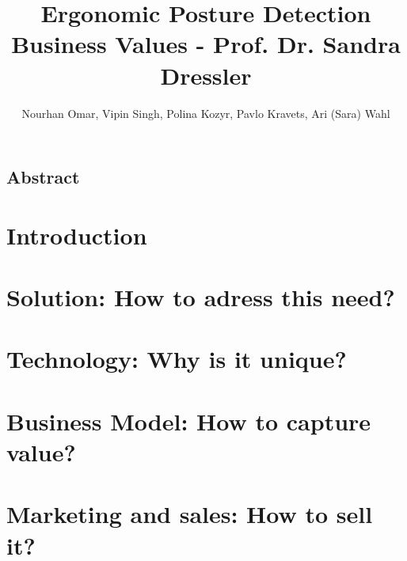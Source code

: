 \documentclass[a4paper, 11pt]{report}
\title{
    {\Huge Ergonomic Posture Detection}\\
    {\large Business Values - Prof. Dr. Sandra Dressler}
}
\author{Nourhan Omar, Vipin Singh, Polina Kozyr, Pavlo Kravets, Ari (Sara) Wahl}
\date{
    \begin{figure}[h]
        \texttt{[image: cover\_image.png]}
    \end{figure}
}
\begin{document}
    

	{
		\FloatBarrier
		\newpage
        \setcounter{page}{2}
		\thispagestyle{plain}
		\vspace*{\fill}
			\section*{{\Large Abstract}}
			
		\vspace*{\fill}
	}

    {
        \FloatBarrier
        \newpage
        \tableofcontents
    }

	{
		\FloatBarrier
		\chapter{Introduction}
		\label{chp:introduction}
		
	}

	{
		\FloatBarrier
		\chapter{Solution: How to adress this need?}
		\label{chp:solution}
		
	}

	{
		\FloatBarrier
		\chapter{Technology: Why is it unique?}
		\label{chp:technology}
		
	}

	{
		\FloatBarrier
		\chapter{Business Model: How to capture value?}
		\label{chp:business_model}
		
	}

	{
		\FloatBarrier
		\chapter{Marketing and sales: How to sell it?}
		\label{chp:marketing}
		
	}
\end{document}
